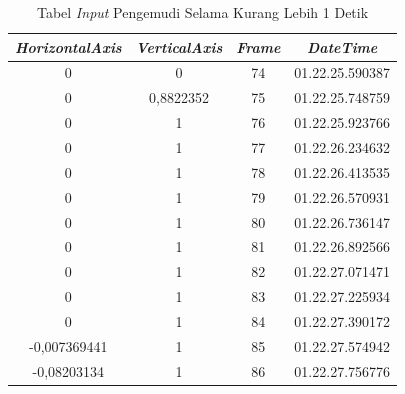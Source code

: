 \begin{table}[]
\caption{Tabel \textit{Input} Pengemudi Selama Kurang Lebih 1 Detik}
\label{tb:4_6}
\begin{tabular}{|c|c|c|c|}
\hline
\textit{\textbf{HorizontalAxis}} & \textit{\textbf{VerticalAxis}} & \textit{\textbf{Frame}} & \textit{\textbf{DateTime}} \\ \hline
0                                & 0                              & 74                      & 01.22.25.590387            \\ \hline
0                                & 0,8822352                      & 75                      & 01.22.25.748759            \\ \hline
0                                & 1                              & 76                      & 01.22.25.923766            \\ \hline
0                                & 1                              & 77                      & 01.22.26.234632            \\ \hline
0                                & 1                              & 78                      & 01.22.26.413535            \\ \hline
0                                & 1                              & 79                      & 01.22.26.570931            \\ \hline
0                                & 1                              & 80                      & 01.22.26.736147            \\ \hline
0                                & 1                              & 81                      & 01.22.26.892566            \\ \hline
0                                & 1                              & 82                      & 01.22.27.071471            \\ \hline
0                                & 1                              & 83                      & 01.22.27.225934            \\ \hline
0                                & 1                              & 84                      & 01.22.27.390172            \\ \hline
-0,007369441                     & 1                              & 85                      & 01.22.27.574942            \\ \hline
-0,08203134                      & 1                              & 86                      & 01.22.27.756776            \\ \hline

\end{tabular}
\end{table}

